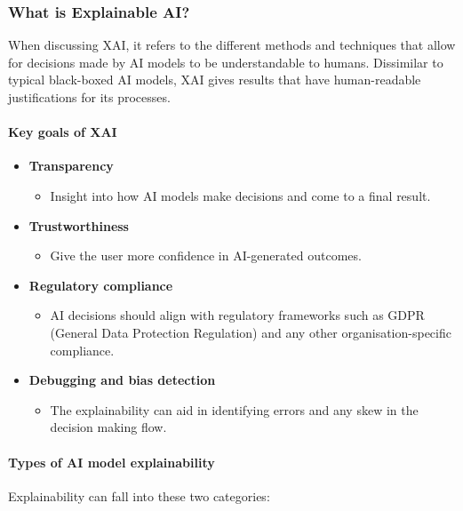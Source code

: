 \subsubsection*{What is Explainable AI?}
When discussing XAI, it refers to the different methods and techniques that allow for decisions made by AI models to be understandable to humans. Dissimilar to typical black-boxed AI models, XAI gives results that have human-readable justifications for its processes.

\paragraph{Key goals of XAI}
\begin{itemize}
    \item \textbf{Transparency}
    \begin{itemize}
        \item Insight into how AI models make decisions and come to a final result.
    \end{itemize}
    \item \textbf{Trustworthiness}
    \begin{itemize}
        \item Give the user more confidence in AI-generated outcomes.
    \end{itemize}
    \item \textbf{Regulatory compliance}
    \begin{itemize}
        \item AI decisions should align with regulatory frameworks such as GDPR (General Data Protection Regulation) and any other organisation-specific compliance.
    \end{itemize}
    \item \textbf{Debugging and bias detection}
    \begin{itemize}
        \item The explainability can aid in identifying errors and any skew in the decision making flow.
    \end{itemize}
\end{itemize}

\paragraph{Types of AI model explainability}
Explainability can fall into these two categories:

